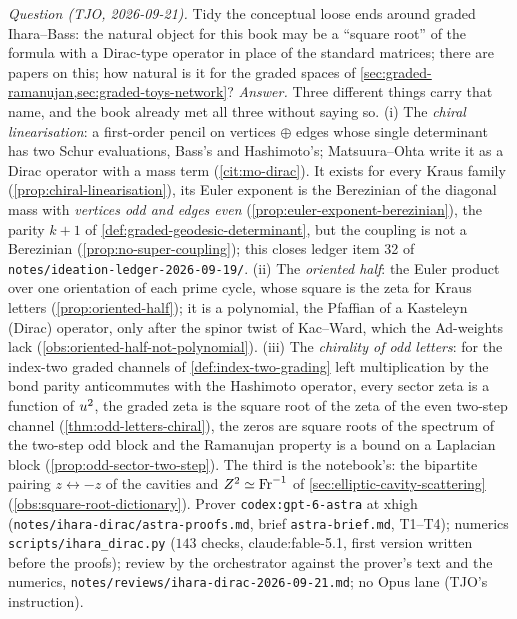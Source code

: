 \emph{Question (TJO, 2026-09-21).} Tidy the conceptual loose ends around graded Ihara--Bass: the
natural object for this book may be a ``square root'' of the formula with a Dirac-type operator in
place of the standard matrices; there are papers on this; how natural is it for the graded spaces of
\cref{sec:graded-ramanujan,sec:graded-toys-network}? \emph{Answer.} Three different things carry that
name, and the book already met all three without saying so. (i) The \emph{chiral linearisation}: a
first-order pencil on vertices $\oplus$ edges whose single determinant has two Schur evaluations, Bass's
and Hashimoto's; Matsuura--Ohta \cite{matsuura2025fermions} write it as a Dirac operator with a mass
term (\cref{cit:mo-dirac}). It exists for every Kraus family (\cref{prop:chiral-linearisation}), its Euler
exponent is the Berezinian of the diagonal mass with \emph{vertices odd and edges even}
(\cref{prop:euler-exponent-berezinian}), the parity $k+1$ of \cref{def:graded-geodesic-determinant}, but
the coupling is not a Berezinian (\cref{prop:no-super-coupling}); this closes ledger item 32 of
\texttt{notes/ideation-ledger-2026-09-19/}. (ii) The \emph{oriented half}: the Euler product over one
orientation of each prime cycle, whose square is the zeta for Kraus letters (\cref{prop:oriented-half});
it is a polynomial, the Pfaffian of a Kasteleyn (Dirac) operator, only after the spinor twist of Kac--Ward,
which the Ad-weights lack (\cref{obs:oriented-half-not-polynomial}). (iii) The \emph{chirality of odd
letters}: for the index-two graded channels of \cref{def:index-two-grading} left multiplication by the
bond parity anticommutes with the Hashimoto operator, every sector zeta is a function of $u^2$, the
graded zeta is the square root of the zeta of the even two-step channel (\cref{thm:odd-letters-chiral}),
the zeros are square roots of the spectrum of the two-step odd block and the Ramanujan property is a bound
on a Laplacian block (\cref{prop:odd-sector-two-step}). The third is the notebook's: the bipartite pairing
$z\leftrightarrow-z$ of the cavities and $Z^2\simeq\mathrm{Fr}^{-1}$ of \cref{sec:elliptic-cavity-scattering}
(\cref{obs:square-root-dictionary}). Prover \texttt{codex:gpt-6-astra} at xhigh
(\texttt{notes/ihara-dirac/astra-proofs.md}, brief \texttt{astra-brief.md}, T1--T4); numerics
\texttt{scripts/ihara\_dirac.py} ($143$ checks, claude:fable-5.1, first version written before the proofs);
review by the orchestrator against the prover's text and the numerics,
\texttt{notes/reviews/ihara-dirac-2026-09-21.md}; no Opus lane (TJO's instruction).

